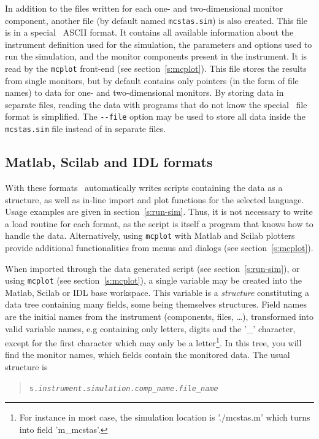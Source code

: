 In addition to the files written for each one- and two-dimensional
monitor component, another file (by default named \verb+mcstas.sim+) is
also created. This file is in a special \MCS\ ASCII format. It contains
all available information about the instrument definition used for the
simulation, the parameters and options used to run the simulation, and
the monitor components present in the instrument. It is read by the
\verb+mcplot+ front-end (see section~\ref{s:mcplot}). This file stores
the results from single monitors, but by default contains only pointers
(in the form of file names) to data for one- and two-dimensional
monitors. By storing data in separate files, reading the data with
programs that do not know the special \MCS\ file format is
simplified. The \verb+--file+ option may be used to store all data
inside the \verb+mcstas.sim+ file instead of in separate files.

\subsection{Matlab, Scilab and IDL formats}
   

With these formats \MCS\ automatically writes scripts containing the data as a structure, as well as in-line import and plot functions for the selected language. Usage examples are given in section~\ref{s:run-sim}.
Thus, it is not necessary to write a load routine for each format, as the script is itself a program that knows how to handle the data. Alternatively, using \verb+mcplot+ with Matlab and Scilab plotters provide additional functionalities from menus and dialogs (see section~\ref{s:mcplot}).

When imported through the data generated script (see section~\ref{s:run-sim}), or using \verb+mcplot+ (see section~\ref{s:mcplot}), a single variable may be created into the Matlab, Scilab or IDL base workspace. This variable is a \emph{structure} constituting a data tree containing many fields, some being themselves structures. Field names are the initial names from the instrument (components, files, \ldots), transformed into valid variable names, e.g containing only letters, digits and the '\_' character, except for the first character which may only be a letter\footnote{For instance in most case, the simulation location is './mcstas.m' which turns into field 'm\_mcstas'.}.
In this tree, you will find the monitor names, which fields contain the monitored data. The usual structure is
\begin{quote}
  \texttt{s.{\it instrument}.{\it simulation}.{\it comp\_name}.{\it file\_name}}
\end{quote}

